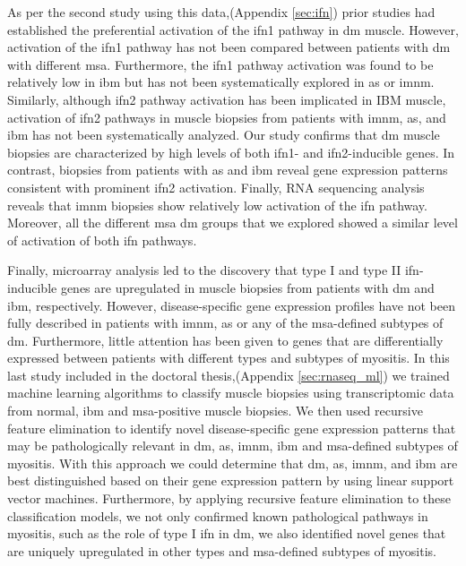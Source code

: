 As per the second study using this data,(Appendix \autoref{sec:ifn}) prior studies had established the preferential activation of the \gls{ifn}1 pathway in \gls{dm} muscle.\cite{Greenberg2005} However, activation of the \gls{ifn}1 pathway has not been compared between patients with \gls{dm} with different \gls{msa}. Furthermore, the \gls{ifn}1 pathway activation was found to be relatively low in \gls{ibm} but has not been systematically explored in \gls{as} or \gls{imnm}.\cite{Greenberg2005,Salajegheh2010,Greenberg2002} Similarly, although \gls{ifn}2 pathway activation has been implicated in IBM muscle,\cite{Ivanidze2011,Allenbach2014} activation of \gls{ifn}2 pathways in muscle biopsies from patients with \gls{imnm}, \gls{as}, and \gls{ibm} has not been systematically analyzed. Our study confirms that \gls{dm} muscle biopsies are characterized by high levels of both \gls{ifn}1- and \gls{ifn}2-inducible genes. In contrast, biopsies from patients with \gls{as} and \gls{ibm} reveal gene expression patterns consistent with prominent \gls{ifn}2 activation. Finally, RNA sequencing analysis reveals that \gls{imnm} biopsies show relatively low activation of the \gls{ifn} pathway. Moreover, all the different \gls{msa} \gls{dm} groups that we explored showed a similar level of activation of both \gls{ifn} pathways.

Finally, microarray analysis led to the discovery that type I and type II \gls{ifn}-inducible genes are upregulated in muscle biopsies from patients with \gls{dm}\cite{Greenberg2005} and \gls{ibm},\cite{Ivanidze2011,Allenbach2014} respectively. However, disease-specific gene expression profiles have not been fully described in patients with \gls{imnm}, \gls{as} or any of the \gls{msa}-defined subtypes of \gls{dm}. Furthermore, little attention has been given to genes that are differentially expressed between patients with different types and subtypes of myositis.\cite{Greenberg2005,Greenberg2002,Hamann2017,Raju2005} In this last study included in the doctoral thesis,(Appendix \autoref{sec:rnaseq_ml}) we trained machine learning algorithms to classify muscle biopsies using transcriptomic data from normal, \gls{ibm} and \gls{msa}-positive muscle biopsies. We then used recursive feature elimination to identify novel disease-specific gene expression patterns that may be pathologically relevant in \gls{dm},  \gls{as}, \gls{imnm}, \gls{ibm} and \gls{msa}-defined subtypes of myositis. With this approach we could determine that \gls{dm},  \gls{as}, \gls{imnm}, and \gls{ibm} are best distinguished based on their gene expression pattern by using linear support vector machines. Furthermore, by applying recursive feature elimination to these classification models, we not only confirmed known pathological pathways in myositis, such as the role of type I \gls{ifn} in \gls{dm}, we also identified novel genes that are uniquely upregulated in other types and \gls{msa}-defined subtypes of myositis.

